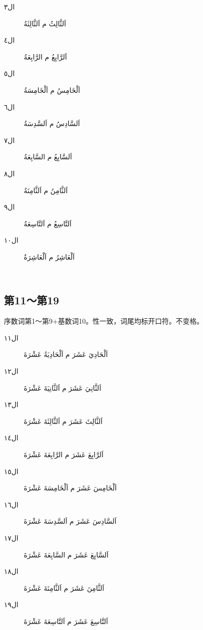 \begin{Arabic}
    \begin{multicols}{3}
        \begin{description}
            \item[ال٣] اَلثَّالِثُ م اَلثَّالِثَةُ
            \item[ال٤] اَلرَّابِعُ م الرَّابِعَةُ
            \item[ال٥] اَلْخَامِسُ م اَلْخَامِسَةُ
            \item[ال٦] اَلسَّادِسُ م اَلسَّدِسَةُ
            \item[ال٧] اَلسَّابِعُ م السَّابِعَةُ
            \item[ال٨] اَلثَّامِنُ م اَلثَّامِنَةُ
            \item[ال٩] اَلتَّاسِعُ م اَلتَّاسِعَةُ
            \item[ال١٠] اَلْعَاشِرُ م اَلْعَاشِرَةُ
            \item[~] 
        \end{description}
    \end{multicols}
\end{Arabic}

\subsection{第11～第19}

序数词第1～第9+基数词10。性一致，词尾均标开口符。不变格。

\begin{Arabic}
    \begin{multicols}{2}
        \begin{description}
            \item[ال١١] اَلْحَادِيَ عَشَرَ م اَلْحَادِيَةُ عَشْرَةَ
            \item[ال١٢] اَلثَّانِيَ عَشَرَ م اَلثَّانِيَةَ عَشْرَةَ
            \item[ال١٣] اَلثَّالِثَ عَشَرَ م اَلثَّالِثَةَ عَشْرَةَ
            \item[ال١٤] اَلرَّابِعَ عَشَرَ م الرَّابِعَةَ عَشْرَةَ
            \item[ال١٥] اَلْخَامِسَ عَشَرَ م اَلْخَامِسَةَ عَشْرَةَ
            \item[ال١٦] اَلسَّادِسَ عَشَرَ م اَلسَّدِسَةَ عَشْرَةَ
            \item[ال١٧] اَلسَّابِعَ عَشَرَ م السَّابِعَةَ عَشْرَةَ
            \item[ال١٨] اَلثَّامِنَ عَشَرَ م اَلثَّامِنَةَ عَشْرَةَ
            \item[ال١٩] اَلتَّاسِعَ عَشَرَ م اَلتَّاسِعَةَ عَشْرَةَ
            \item[~] 
        \end{description}
    \end{multicols}
\end{Arabic}

